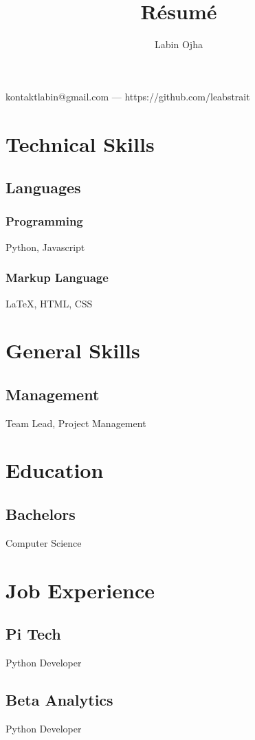 \documentclass{article}
\title{R\'esum\'e}
\author{Labin Ojha}
\makeatletter
\renewcommand{\maketitle}{
    \begin{center}
        {\huge\bfseries\theauthor}

        \vspace{.25em}
        kontaktlabin@gmail.com --- https://github.com/leabstrait
    \end{center}
}
\makeatother
\begin{document}
\maketitle

\section{Technical Skills}
\subsection{Languages}
\subsubsection{Programming}
Python, Javascript
\subsubsection{Markup Language}
{\LaTeX}, HTML, CSS

\section{General Skills}
\subsection{Management}
Team Lead, Project Management

\section{Education}
\subsection{Bachelors}
Computer Science

\section{Job Experience}
\subsection{Pi Tech}
Python Developer
\subsection{Beta Analytics}
Python Developer
\end{document}
